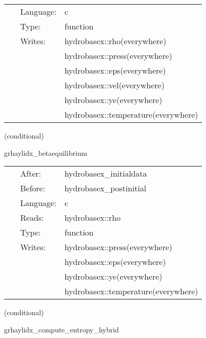 \hspace{5mm}

 \begin{tabular*}{160mm}{cll} 
~ & Language:  & c \\ 
~ & Type:  & function \\ 
~ & Writes:  & hydrobasex::rho(everywhere) \\ 
~& ~ &hydrobasex::press(everywhere)\\ 
~& ~ &hydrobasex::eps(everywhere)\\ 
~& ~ &hydrobasex::vel(everywhere)\\ 
~& ~ &hydrobasex::ye(everywhere)\\ 
~& ~ &hydrobasex::temperature(everywhere)\\ 
\end{tabular*} 


\vspace{5mm}

   (conditional) 

\hspace{5mm} grhaylidx\_betaequilibrium 

\hspace{5mm}{\it set y\_e, temperature, entropy, press, eps in neutrino free beta-equilibrium } 


\hspace{5mm}

 \begin{tabular*}{160mm}{cll} 
~ & After:  & hydrobasex\_initialdata \\ 
~ & Before:  & hydrobasex\_postinitial \\ 
~ & Language:  & c \\ 
~ & Reads:  & hydrobasex::rho \\ 
~ & Type:  & function \\ 
~ & Writes:  & hydrobasex::press(everywhere) \\ 
~& ~ &hydrobasex::eps(everywhere)\\ 
~& ~ &hydrobasex::ye(everywhere)\\ 
~& ~ &hydrobasex::temperature(everywhere)\\ 
\end{tabular*} 


\vspace{5mm}

\noindent {\bf }   (conditional) 

\hspace{5mm} grhaylidx\_compute\_entropy\_hybrid 

